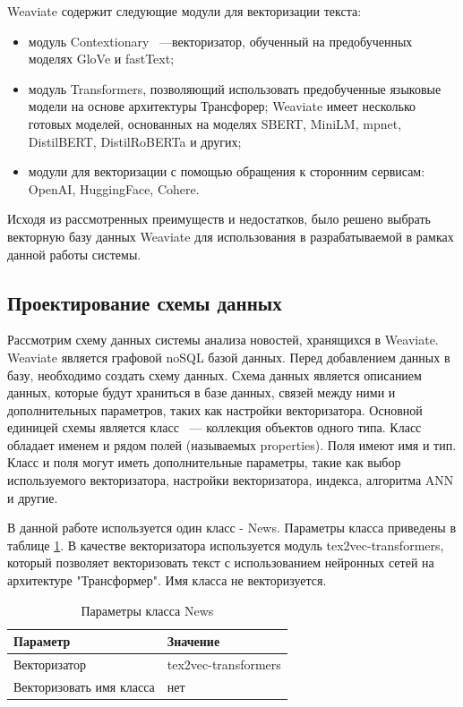 Weaviate содержит следующие модули для векторизации текста:
\begin{itemize}
    \item модуль Contextionary ~---векторизатор, обученный на предобученных моделях GloVe и fastText;
    \item модуль Transformers, позволяющий использовать предобученные языковые модели на основе архитектуры Трансфорер; Weaviate имеет несколько готовых моделей, основанных на моделях SBERT, MiniLM, mpnet, DistilBERT, DistilRoBERTa и других;
    \item модули для векторизации с помощью обращения к сторонним сервисам: OpenAI, HuggingFace, Cohere.
\end{itemize}

Исходя из рассмотренных преимуществ и недостатков, было решено выбрать векторную базу данных Weaviate для использования в разрабатываемой в рамках данной работы системы.

\subsection{Проектирование схемы данных}
\label{chap:data-scheme}
Рассмотрим схему данных системы анализа новостей, хранящихся в Weaviate. Weaviate является графовой noSQL базой данных. Перед добавлением данных в базу, необходимо создать схему данных. Схема данных является описанием данных, которые будут храниться в базе данных, связей между ними и дополнительных параметров, таких как настройки векторизатора. Основной единицей схемы является класс ~--- коллекция объектов одного типа. Класс обладает именем и рядом полей (называемых properties). Поля имеют имя и тип. Класс и поля могут иметь дополнительные параметры, такие как выбор используемого векторизатора, настройки векторизатора, индекса, алгоритма ANN и другие.

В данной работе используется один класс - News. Параметры класса приведены в таблице \ref{tab:class-news-settings}. В качестве векторизатора используется модуль tex2vec-transformers, который позволяет векторизовать текст с использованием нейронных сетей на архитектуре "Трансформер". Имя класса не векторизуется.

\begin{table}[ht]
    \caption{Параметры класса News}
    \label{tab:class-news-settings}
    \begin{tabularx}{\textwidth}{|X|X|}
        \hline
        Параметр & Значение \\
        \hline
        Векторизатор & tex2vec-transformers \\
        \hline
        Векторизовать имя класса & нет \\
        \hline
    \end{tabularx}
\end{table}

